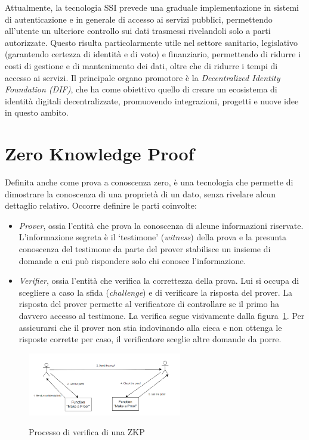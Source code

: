 Attualmente, la tecnologia SSI prevede una graduale implementazione in sistemi di autenticazione e
in generale di accesso ai servizi pubblici, permettendo all'utente un ulteriore controllo
sui dati trasmessi rivelandoli solo a parti autorizzate.
Questo risulta particolarmente utile nel settore sanitario, legislativo (garantendo certezza di identità e di voto) e finanziario,
permettendo di ridurre i costi di gestione e di mantenimento dei dati, oltre che di ridurre i tempi di accesso ai servizi.
Il principale organo promotore è la \textit{Decentralized Identity Foundation (DIF)}, che ha come obiettivo quello di creare
un ecosistema di identità digitali decentralizzate, promuovendo integrazioni, progetti e nuove idee in questo ambito. 

\section{Zero Knowledge Proof}\label{sec:zero-knowledge-proof}
Definita anche come prova a conoscenza zero, è una tecnologia che permette di dimostrare la conoscenza di una proprietà di un dato,
senza rivelare alcun dettaglio relativo.
Occorre definire le parti coinvolte:
\begin{itemize}
    \item \textit{Prover}, ossia l'entità che prova la conoscenza di alcune informazioni riservate. 
    L'informazione segreta è il `testimone' (\textit{witness}) della prova e la presunta conoscenza del testimone da parte del prover stabilisce un insieme di domande a cui può rispondere solo chi conosce l'informazione. 
    \item \textit{Verifier}, ossia l'entità che verifica la correttezza della prova. Lui si occupa di scegliere a caso la sfida (\textit{challenge}) e di verificare la risposta del prover.
    La risposta del prover permette al verificatore di controllare se il primo ha davvero accesso al testimone. La verifica segue visivamente dalla figura~\ref{fig:zkp}. 
    Per assicurarsi che il prover non stia indovinando alla cieca e non ottenga le risposte corrette per caso, il verificatore sceglie altre domande da porre.
\end{itemize}

\begin{figure}[ht] 
    \centering
    \includegraphics[width=0.6\textwidth, alt={Come funziona la verifica nella ZKP}]{immagini/zkp.png}
    \caption{Processo di verifica di una ZKP}\label{fig:zkp}
\end{figure}

